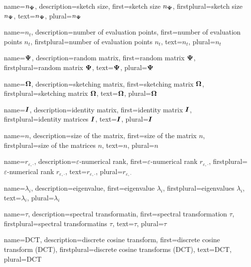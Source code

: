 {%
  name={$n_{\boldsymbol{\Psi}}$},%
  description={sketch size},%
  first={sketch size $n_{\boldsymbol{\Psi}}$},%
  firstplural={sketch size $n_{\boldsymbol{\Psi}}$},%
  text={$n_{\boldsymbol{\Psi}}$},%
  plural={$n_{\boldsymbol{\Psi}}$}%
}

{%
  name={$n_t$},%
  description={number of evaluation points},%
  first={number of evaluation points $n_t$},%
  firstplural={number of evaluation points $n_t$},%
  text={$n_t$},%
  plural={$n_t$}%
}

{%
  name={$\boldsymbol{\Psi}$},%
  description={random matrix},%
  first={random matrix $\boldsymbol{\Psi}$},%
  firstplural={random matrix $\boldsymbol{\Psi}$},%
  text={$\boldsymbol{\Psi}$},%
  plural={$\boldsymbol{\Psi}$}%
}

{%
  name={$\boldsymbol{\Omega}$},%
  description={sketching matrix},%
  first={sketching matrix $\boldsymbol{\Omega}$},%
  firstplural={sketching matrix $\boldsymbol{\Omega}$},%
  text={$\boldsymbol{\Omega}$},%
  plural={$\boldsymbol{\Omega}$}%
}

{%
  name={$\boldsymbol{I}$},%
  description={identity matrix},%
  first={identity matrix $\boldsymbol{I}$},%
  firstplural={identity matrices $\boldsymbol{I}$},%
  text={$\boldsymbol{I}$},%
  plural={$\boldsymbol{I}$}%
}

{%
  name={$n$},%
  description={size of the matrix},%
  first={size of the matrix $n$},%
  firstplural={size of the matrices $n$},%
  text={$n$},%
  plural={$n$}%
}

{%
  name={$r_{\varepsilon, \cdot}$},%
  description={$\varepsilon$-numerical rank},%
  first={$\varepsilon$-numerical rank $r_{\varepsilon, \cdot}$},%
  firstplural={$\varepsilon$-numerical rank $r_{\varepsilon, \cdot}$},%
  text={$r_{\varepsilon, \cdot}$},%
  plural={$r_{\varepsilon, \cdot}$}%
}

{%
  name={$\lambda_i$},%
  description={eigenvalue},%
  first={eigenvalue $\lambda_i$},%
  firstplural={eigenvalues $\lambda_i$},%
  text={$\lambda_i$},%
  plural={$\lambda_i$}%
}

{%
  name={$\tau$},%
  description={spectral transformatin},%
  first={spectral transformation $\tau$},%
  firstplural={spectral transformatins $\tau$},%
  text={$\tau$},%
  plural={$\tau$}%
}

{%
  name={DCT},%
  description={discrete cosine transform},%
  first={discrete cosine transform (DCT)},%
  firstplural={discrete cosine transforms (DCT)},%
  text={DCT},%
  plural={DCT}%
}

